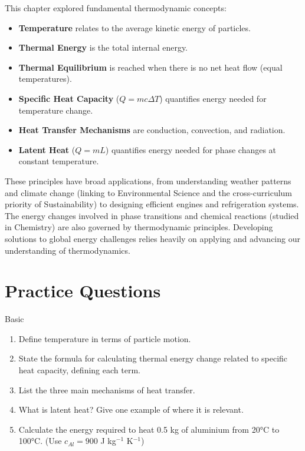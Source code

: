This chapter explored fundamental thermodynamic concepts:
\begin{itemize}
    \item \textbf{Temperature} relates to the average kinetic energy of particles.
    \item \textbf{Thermal Energy} is the total internal energy.
    \item \textbf{Thermal Equilibrium} is reached when there is no net heat flow (equal temperatures).
    \item \textbf{Specific Heat Capacity} (\(Q = mc\Delta T\)) quantifies energy needed for temperature change.
    \item \textbf{Heat Transfer Mechanisms} are conduction, convection, and radiation.
    \item \textbf{Latent Heat} (\(Q = mL\)) quantifies energy needed for phase changes at constant temperature.
\end{itemize}

These principles have broad applications, from understanding weather patterns and climate change (linking to Environmental Science and the cross-curriculum priority of Sustainability) to designing efficient engines and refrigeration systems. The energy changes involved in phase transitions and chemical reactions (studied in Chemistry) are also governed by thermodynamic principles. Developing solutions to global energy challenges relies heavily on applying and advancing our understanding of thermodynamics.

\FloatBarrier

\section{Practice Questions}
\label{sec:thermo_questions}
\FloatBarrier

\begin{tieredquestions}{Basic}
\begin{enumerate}
    \item Define temperature in terms of particle motion.
    \item State the formula for calculating thermal energy change related to specific heat capacity, defining each term.
    \item List the three main mechanisms of heat transfer.
    \item What is latent heat? Give one example of where it is relevant.
    \item Calculate the energy required to heat 0.5 kg of aluminium from 20°C to 100°C. (Use \(c_{Al} = 900\) J kg\(^{-1}\) K\(^{-1}\))
\end{enumerate}
\end{tieredquestions}

